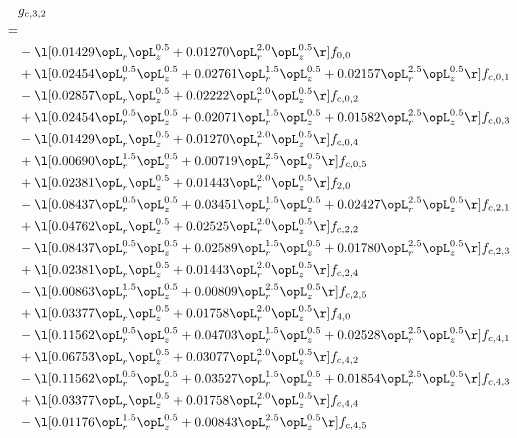 \begin{alignat}{2} 
\label{eq:g_32_0} 
& g_{c,3,2} \nonumber \\ 
 = \\ 
& - \l[  0.01429 \opL_r \opL_z^{0.5} +  0.01270 \opL_r^{2.0} \opL_z^{0.5}  \r] f_{0,0} \nonumber \\ 
& + \l[  0.02454 \opL_r^{0.5} \opL_z^{0.5} +  0.02761 \opL_r^{1.5} \opL_z^{0.5} +  0.02157 \opL_r^{2.5} \opL_z^{0.5}  \r] f_{c,0,1} \nonumber \\ 
& - \l[  0.02857 \opL_r \opL_z^{0.5} +  0.02222 \opL_r^{2.0} \opL_z^{0.5}  \r] f_{c,0,2} \nonumber \\ 
& + \l[  0.02454 \opL_r^{0.5} \opL_z^{0.5} +  0.02071 \opL_r^{1.5} \opL_z^{0.5} +  0.01582 \opL_r^{2.5} \opL_z^{0.5}  \r] f_{c,0,3} \nonumber \\ 
& - \l[  0.01429 \opL_r \opL_z^{0.5} +  0.01270 \opL_r^{2.0} \opL_z^{0.5}  \r] f_{c,0,4} \nonumber \\ 
& + \l[  0.00690 \opL_r^{1.5} \opL_z^{0.5} +  0.00719 \opL_r^{2.5} \opL_z^{0.5}  \r] f_{c,0,5} \nonumber \\ 
& + \l[  0.02381 \opL_r \opL_z^{0.5} +  0.01443 \opL_r^{2.0} \opL_z^{0.5}  \r] f_{2,0} \nonumber \\ 
& - \l[  0.08437 \opL_r^{0.5} \opL_z^{0.5} +  0.03451 \opL_r^{1.5} \opL_z^{0.5} +  0.02427 \opL_r^{2.5} \opL_z^{0.5}  \r] f_{c,2,1} \nonumber \\ 
& + \l[  0.04762 \opL_r \opL_z^{0.5} +  0.02525 \opL_r^{2.0} \opL_z^{0.5}  \r] f_{c,2,2} \nonumber \\ 
& - \l[  0.08437 \opL_r^{0.5} \opL_z^{0.5} +  0.02589 \opL_r^{1.5} \opL_z^{0.5} +  0.01780 \opL_r^{2.5} \opL_z^{0.5}  \r] f_{c,2,3} \nonumber \\ 
& + \l[  0.02381 \opL_r \opL_z^{0.5} +  0.01443 \opL_r^{2.0} \opL_z^{0.5}  \r] f_{c,2,4} \nonumber \\ 
& - \l[  0.00863 \opL_r^{1.5} \opL_z^{0.5} +  0.00809 \opL_r^{2.5} \opL_z^{0.5}  \r] f_{c,2,5} \nonumber \\ 
& + \l[  0.03377 \opL_r \opL_z^{0.5} +  0.01758 \opL_r^{2.0} \opL_z^{0.5}  \r] f_{4,0} \nonumber \\ 
& - \l[  0.11562 \opL_r^{0.5} \opL_z^{0.5} +  0.04703 \opL_r^{1.5} \opL_z^{0.5} +  0.02528 \opL_r^{2.5} \opL_z^{0.5}  \r] f_{c,4,1} \nonumber \\ 
& + \l[  0.06753 \opL_r \opL_z^{0.5} +  0.03077 \opL_r^{2.0} \opL_z^{0.5}  \r] f_{c,4,2} \nonumber \\ 
& - \l[  0.11562 \opL_r^{0.5} \opL_z^{0.5} +  0.03527 \opL_r^{1.5} \opL_z^{0.5} +  0.01854 \opL_r^{2.5} \opL_z^{0.5}  \r] f_{c,4,3} \nonumber \\ 
& + \l[  0.03377 \opL_r \opL_z^{0.5} +  0.01758 \opL_r^{2.0} \opL_z^{0.5}  \r] f_{c,4,4} \nonumber \\ 
& - \l[  0.01176 \opL_r^{1.5} \opL_z^{0.5} +  0.00843 \opL_r^{2.5} \opL_z^{0.5}  \r] f_{c,4,5} \nonumber \\ 
\end{alignat} 


